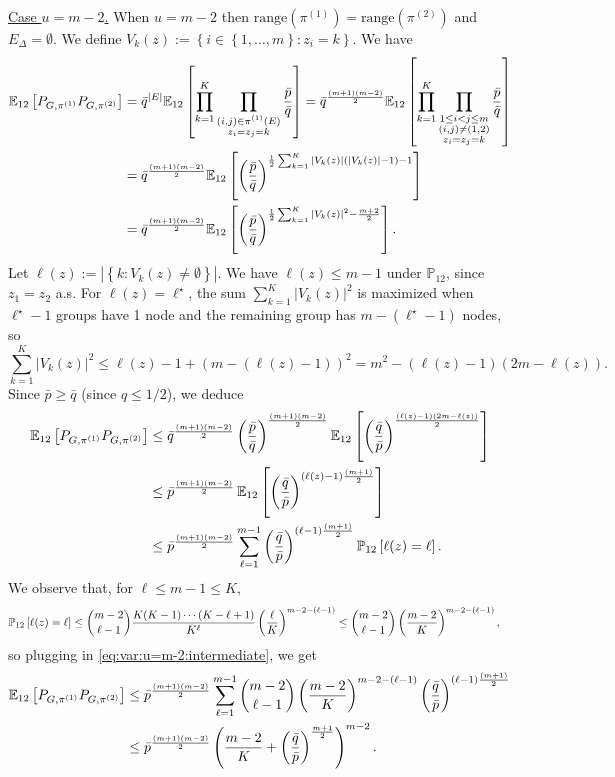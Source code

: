 \documentclass[final]{colt2026}
\newcommand{\1}{\mathbf{1}}
\newcommand{\bbE}{\mathbb{E}}
\newcommand{\bbP}{\mathbb{P}}
\newcommand{\pa}[1]{\left(#1\right)}
\newcommand{\ac}[1]{\left\{#1\right\}}
\newcommand{\cro}[1]{\left[#1\right]}
\begin{document}
\noindent\underline{Case $u= m-2$.} When $u=m-2$ then $\text{range}(\pi^{(1)})= \text{range}(\pi^{(2)})$
and $E_{\Delta}=\emptyset$. We define $V_{k}(z):=\ac{i\in\ac{1,\ldots,m}: z_{i}=k}$.
We have
\begin{align*}
\bbE_{12}\cro{P_{G,\pi^{(1)}}P_{G,\pi^{(2)}}}& = \bar q^{|E|} \bbE_{12}\cro{\prod_{k=1}^{K}\prod_{\substack{(i,j)\in \pi^{(1)}(E)\\ z_{i}=z_{j}=k}}{\bar p\over \bar q}}
 =  \bar q^{(m+1)(m-2)\over 2} \bbE_{12}\cro{\prod_{k=1}^{K}\prod_{\substack{1\leq i<j\leq m\\ (i,j)\neq (1,2)\\ z_{i}=z_{j}=k}}{\bar p\over \bar q}}\\
& =  \bar q^{(m+1)(m-2)\over 2} \bbE_{12}\cro{\pa{\bar p\over \bar q}^{{1\over 2}\sum_{k=1}^K |V_{k}(z)|(|V_{k}(z)|-1)-1}}\\
& =   \bar q^{(m+1)(m-2)\over 2} \bbE_{12}\cro{\pa{\bar p\over \bar q}^{{1\over 2}\sum_{k=1}^K |V_{k}(z)|^2-{m+2\over 2}}}.
\end{align*}
 Let $\ell(z):=|\ac{k:V_{k}(z)\neq \emptyset}|$. We have $\ell(z)\leq m-1$ under $\bbP_{12}$, since $z_{1}=z_{2}$ a.s.
For $\ell(z)=\ell^\star$, the sum $\sum_{k=1}^K |V_{k}(z)|^2$ is maximized  when $\ell^\star-1$ groups have 1 node and the remaining group has $m-(\ell^\star-1)$ nodes, so 
$$\sum_{k=1}^K |V_{k}(z)|^2\leq \ell(z)-1+(m-(\ell(z)-1))^2=m^2-(\ell(z)-1)(2m-\ell(z)).$$
Since  $\bar p\geq \bar q$ (since $q\leq 1/2$), we deduce
\begin{align}
\bbE_{12}\cro{P_{G,\pi^{(1)}}P_{G,\pi^{(2)}}}
& \leq   \bar q^{(m+1)(m-2)\over 2} \pa{\bar p\over \bar q}^{(m+1)(m-2)\over 2} \bbE_{12}\cro{\pa{\bar q\over \bar p}^{{(\ell(z)-1)(2m-\ell(z))\over 2}}}\nonumber\\
& \leq   \bar p^{(m+1)(m-2)\over 2} \,\bbE_{12}\cro{\pa{\bar q\over \bar p}^{(\ell(z)-1){(m+1)\over 2}}}\nonumber\\
& \leq   \bar p^{(m+1)(m-2)\over 2} \sum_{\ell=1}^{m-1}\pa{\bar q\over \bar p}^{(\ell-1){(m+1)\over 2}}\bbP_{12}\cro{\ell(z)=\ell}.\label{eq:var:u=m-2:intermediate}
\end{align}
We observe that, for $\ell\leq m-1\leq K$,
\begin{align*}
\bbP_{12}\cro{\ell(z)=\ell}& \leq \binom{m-2}{\ell-1} {K(K-1)\cdots (K-\ell+1)\over K^{\ell}} \pa{\ell \over K}^{m-2-(\ell-1)} \leq  \binom{m-2}{\ell-1}\pa{m-2 \over K}^{m-2-(\ell-1)},
\end{align*}
so plugging in \eqref{eq:var:u=m-2:intermediate}, we get
\begin{align}
\bbE_{12}\cro{P_{G,\pi^{(1)}}P_{G,\pi^{(2)}}}
&\leq   \bar p^{(m+1)(m-2)\over 2} \sum_{\ell=1}^{m-1} \binom{m-2}{\ell-1}\pa{m-2 \over K}^{m-2-(\ell-1)} \pa{\bar q\over \bar p}^{(\ell-1){(m+1)\over 2}}\nonumber \\
&\leq  \bar p^{(m+1)(m-2)\over 2} \pa{{m-2 \over K}+\pa{\bar q\over \bar p}^{{m+1\over 2}}}^{m-2}.
\label{eq:var:u=m-2}
\end{align}
\end{document}
